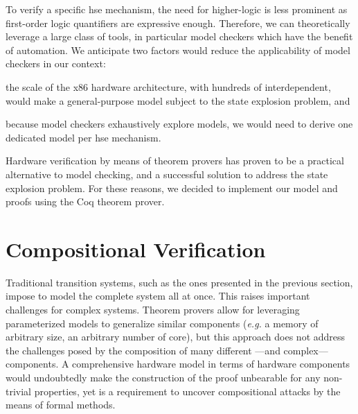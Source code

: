 To verify a specific \ac{hse} mechanism, the need for higher-logic is less
prominent as first-order logic quantifiers are expressive enough.
%
Therefore, we can theoretically leverage a large class of tools, in particular
model checkers which have the benefit of automation.
%
We anticipate two factors would reduce the applicability of model checkers in
our context:
%
\begin{inparaenum}[(1)]
\item the scale of the x86 hardware architecture, with hundreds of
  interdependent, would make a general-purpose model subject to the state
  explosion problem, and
\item because model checkers exhaustively explore models, we would need to
  derive one dedicated model per \ac{hse} mechanism.
\end{inparaenum}
%
Hardware verification by means of theorem provers has proven to be a practical
alternative to model checking, and a successful solution to
address the state explosion problem.
%
For these reasons, we decided to implement our model and proofs using the Coq
theorem prover.

\section{Compositional Verification}
\label{section:sota:compsec}

Traditional transition systems, such as the ones presented in the previous
section, impose to model the complete system all at once.
%
This raises important challenges for complex systems.
%
Theorem provers allow for leveraging parameterized models to generalize similar
components (\emph{e.g.} a memory of arbitrary size, an arbitrary number of
core), but this approach does not address the challenges posed by the
composition of many different ---and complex--- components.
%
A comprehensive hardware model in terms of hardware components would undoubtedly
make the construction of the proof unbearable for any non-trivial properties,
yet is a requirement to uncover compositional attacks by the means of formal
methods.
%

